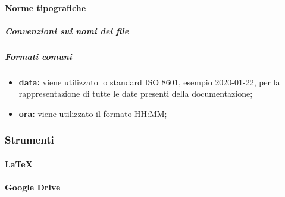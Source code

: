 			\paragraph{Norme tipografiche}
				\subparagraph{Convenzioni sui nomi dei file}
				\subparagraph{Formati comuni}
					\begin{itemize}
						\item \textbf{data:} viene utilizzato lo standard ISO 8601, esempio 2020-01-22, per la rappresentazione di tutte le date presenti della documentazione;
						\item \textbf{ora:} viene utilizzato il formato HH:MM;
					\end{itemize}
	\subsubsection{Strumenti}
			\paragraph{LaTeX}
			\paragraph{Google Drive}
